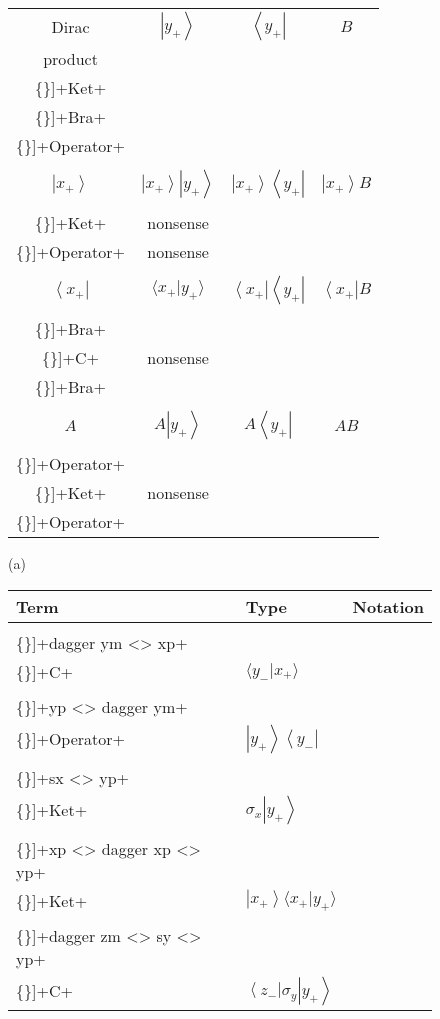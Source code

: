 \documentclass{eptcs}
\newcommand{\VERB}{\Verb[commandchars=\\\{\}]}
\newcommand{\DataTypeTok}[1]{\textcolor[rgb]{0.56,0.13,0.00}{{#1}}}
\newcommand{\FunctionTok}[1]{\textcolor[rgb]{0.02,0.16,0.49}{{#1}}}
\newcommand{\OperatorTok}[1]{\textcolor[rgb]{0.40,0.40,0.40}{{#1}}}
\newcommand{\ket}[1]{\left| #1 \right\rangle}
\newcommand{\bra}[1]{\left\langle #1 \right|}
\begin{document}
\begin{figure}
\begin{center}
  \begin{tabular}{c|ccc}
    Dirac       & $\ket{y_+}$ & $\bra{y_+}$ & $B$ \\
    product     & \VERB+\DataTypeTok{Ket}+ & \VERB+\DataTypeTok{Bra}+ & \VERB+\DataTypeTok{Operator}+ \\ \hline
                & \\
    $\ket{x_+}$ & $\ket{x_+} \ket{y_+}$ & $\ket{x_+} \bra{y_+}$ & $\ket{x_+} B$ \\
  \VERB+\DataTypeTok{Ket}+             & nonsense             & \VERB+\DataTypeTok{Operator}+ & nonsense \\
                & \\
    $\bra{x_+}$ & $\langle x_+ | y_+ \rangle$ & $\bra{x_+} \bra{y_+}$ & $\bra{x_+} B$  \\
  \VERB+\DataTypeTok{Bra}+ & \VERB+\DataTypeTok{C}+ & nonsense & \VERB+\DataTypeTok{Bra}+ \\
                & \\
    $A$         & $A \ket{y_+}$ & $A \bra{y_+}$ & $A B$ \\
  \VERB+\DataTypeTok{Operator}+ & \VERB+\DataTypeTok{Ket}+ & nonsense & \VERB+\DataTypeTok{Operator}+
  \end{tabular}

(a)
\end{center}
\begin{center}
\begin{tabular}{lll}
Term & Type & Notation \\ \hline
\VERB+\FunctionTok{dagger} \FunctionTok{ym} \OperatorTok{<>} \FunctionTok{xp}+
  & \VERB+\DataTypeTok{C}+
  & $\langle y_- | x_+ \rangle$ \\
\VERB+\FunctionTok{yp} \OperatorTok{<>} \FunctionTok{dagger} \FunctionTok{ym}+
  & \VERB+\DataTypeTok{Operator}+
  & $\ket{y_+} \bra{y_-}$ \\
\VERB+\FunctionTok{sx} \OperatorTok{<>} \FunctionTok{yp}+
  & \VERB+\DataTypeTok{Ket}+
  & $\sigma_x \ket{y_+}$ \\
\VERB+\FunctionTok{xp} \OperatorTok{<>} \FunctionTok{dagger} \FunctionTok{xp} \OperatorTok{<>} \FunctionTok{yp}+
  & \VERB+\DataTypeTok{Ket}+
  & $\ket{x_+} \langle x_+ | y_+ \rangle$ \\
\VERB+\FunctionTok{dagger} \FunctionTok{zm} \OperatorTok{<>} \FunctionTok{sy} \OperatorTok{<>} \FunctionTok{yp}+
  & \VERB+\DataTypeTok{C}+
  & $\bra{z_-} \sigma_y \ket{y_+}$
\end{tabular}


\end{center}
\end{figure}
\end{document}
